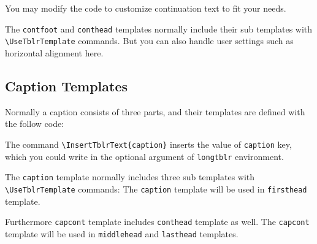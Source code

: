 \documentclass[oneside]{book}
\begin{document}
You may modify the code to customize continuation text to fit your needs.

The \verb!contfoot! and \verb!conthead! templates normally
include their sub templates with \verb!\UseTblrTemplate! commands.
But you can also handle user settings such as horizontal alignment here.

\begin{codehigh}
\end{codehigh}

\subsection{Caption Templates}

Normally a caption consists of three parts, and their templates are defined with the follow code:

\begin{codehigh}
\end{codehigh}

The command \verb!\InsertTblrText{caption}! inserts the value of \verb!caption! key,
which you could write in the optional argument of \verb!longtblr! environment.

The \verb!caption! template normally includes three sub templates with \verb!\UseTblrTemplate! commands:
The \verb!caption! template will be used in \verb!firsthead! template.

\begin{codehigh}
\end{codehigh}

Furthermore \verb!capcont! template includes \verb!conthead! template as well.
The \verb!capcont! template will be used in \verb!middlehead! and \verb!lasthead! templates.

\begin{codehigh}
\end{codehigh}
\end{document}
